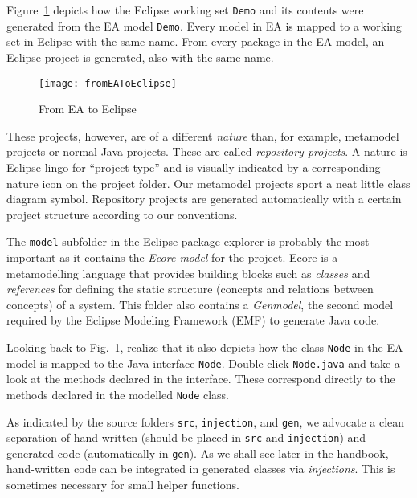 Figure~\ref{fig:fromEAtoEclipse} depicts how the Eclipse working set \texttt{Demo} and its contents were generated from the EA model \texttt{Demo}. Every model
in EA is mapped to a working set in Eclipse with the same name. From every package in the EA model, an Eclipse project is generated, also with the same name.

\begin{figure}[htbp]
    \centering
  \texttt{[image: fromEAToEclipse]}
    \caption{From EA to Eclipse}
    \label{fig:fromEAtoEclipse}
\end{figure}

These projects, however, are of a different \emph{nature} than, for example, metamodel projects or normal Java projects. These are called \emph{repository
projects}. A nature is Eclipse lingo for ``project type'' and is visually indicated by a corresponding nature icon on the project folder. Our metamodel projects
sport a neat little class diagram symbol. Repository projects are generated automatically with a certain project structure according to our conventions.

The \texttt{model} subfolder in the Eclipse package explorer is probably the most important as it contains the \emph{Ecore model} for the project. Ecore is a
metamodelling language that provides building blocks such as \emph{classes} and \emph{references} for defining the  static structure (concepts and relations
between concepts) of a system. This folder also contains a \emph{Genmodel}, the second model required by the Eclipse Modeling Framework (EMF) to generate Java
code.

Looking back to Fig.~\ref{fig:fromEAtoEclipse}, realize that it also depicts how the class \texttt{Node} in the EA model is mapped to the Java interface
\texttt{Node}. Double-click \texttt{Node.java} and take a look at the methods declared in the interface. These correspond directly to the methods declared in
the modelled \texttt{Node} class.

As indicated by the source folders \texttt{src}, \texttt{injection}, and \texttt{gen}, we advocate a clean separation of hand-written (should be placed in
\texttt{src} and \texttt{injection}) and generated code (automatically in \texttt{gen}). As we shall see later in the handbook, hand-written code can be
integrated in generated classes via \emph{injections}. This is sometimes necessary for small helper functions.

